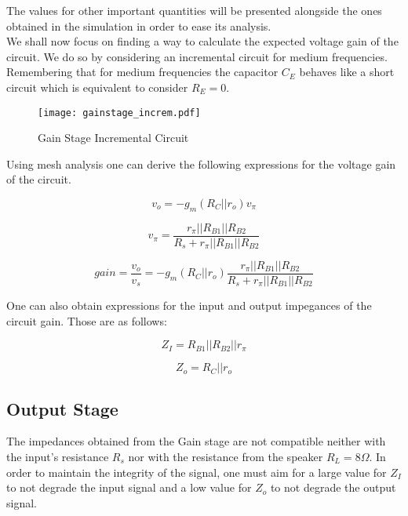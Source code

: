 The values for other important quantities will be presented alongside the ones obtained in the simulation in order to ease its analysis.\\

We shall now focus on finding a way to calculate the expected voltage gain of the circuit. We do so by considering an incremental circuit for medium frequencies. Remembering that for medium frequencies the capacitor $C_E$ behaves like a short circuit which is equivalent to consider $R_E=0$.

\begin{figure}[H]
\centering
\texttt{[image: gainstage\_increm.pdf]}
\caption{Gain Stage Incremental Circuit}
\label{fig:gain_stage_incremental_circuit}
\end{figure}

Using mesh analysis one can derive the following expressions for the voltage gain of the circuit.

\begin{equation}
v_o=-g_m(R_C||r_o)v_{\pi}
\end{equation}

\begin{equation}
v_{\pi}=\frac{r_{\pi}||R_{B1}||R_{B2}}{R_s+r_{\pi}||R_{B1}||R_{B2}}
\end{equation}

\begin{equation}
gain=\frac{v_o}{v_s}=-g_m(R_C||r_o)\frac{r_{\pi}||R_{B1}||R_{B2}}{R_s+r_{\pi}||R_{B1}||R_{B2}}
\end{equation}

One can also obtain expressions for the input and output impegances of the circuit gain. Those are as follows:


\begin{equation}
Z_I=R_{B1}||R_{B2}||r_{\pi}
\end{equation}

\begin{equation}
Z_o=R_C||r_o
\end{equation}

\subsection{Output Stage}
The impedances obtained from the Gain stage are not compatible neither with the input's resistance $R_s$ nor with the resistance from the speaker $R_{L}=8\Omega$. In order to maintain the integrity of the signal, one must aim for a large value for $Z_I$ to not degrade the input signal and a low value for $Z_o$ to not degrade the output signal.\\

